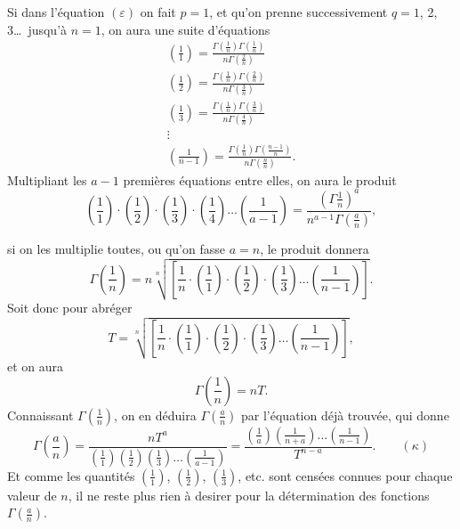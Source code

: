 \documentclass{article}
\begin{document}
Si dans l'équation $(\varepsilon)$ on fait $p=1$, et qu'on prenne successivement $q=1$, 2, 3\ldots\ jusqu'à $n=1$, on aura une suite d'équations
\[ \begin{gathered} \left(\frac{1}{1}\right)=\frac{\Gamma\left(\frac{1}{n}\right)\Gamma\left(\frac{1}{n}\right)}{n\Gamma\left(\frac{2}{n}\right)}\\ \left(\frac{1}{2}\right)=\frac{\Gamma\left(\frac{1}{n}\right)\Gamma\left(\frac{2}{n}\right)}{n\Gamma\left(\frac{3}{n}\right)}\\ \left(\frac{1}{3}\right)=\frac{\Gamma\left(\frac{1}{n}\right)\Gamma\left(\frac{3}{n}\right)}{n\Gamma\left(\frac{4}{n}\right)}\\ \vdots\\ \left(\frac{1}{n-1}\right)=\frac{\Gamma\left(\frac{1}{n}\right)\Gamma\left(\frac{n-1}{n}\right)}{n\Gamma\left(\frac{n}{n}\right)}. \end{gathered} \]
Multipliant les $a-1$ premières équations entre elles, on aura le produit
\[ \left(\frac{1}{1}\right)\cdot\left(\frac{1}{2}\right)\cdot\left(\frac{1}{3}\right)\cdot\left(\frac{1}{4}\right)\ldots\left(\frac{1}{a-1}\right)=\frac{\left(\Gamma\frac{1}{n}\right)^{a}}{n^{a-1}\Gamma\left(\frac{a}{n}\right)}, \]

si on les multiplie toutes, ou qu'on fasse $a=n$, le produit donnera
\[ \Gamma\left(\frac{1}{n}\right)=n\sqrt[n]{\left[\frac{1}{n}\cdot\left(\frac{1}{1}\right)\cdot\left(\frac{1}{2}\right)\cdot\left(\frac{1}{3}\right)\ldots\left(\frac{1}{n-1}\right)\right]}. \]
Soit donc pour abréger
\[ T=\sqrt[n]{\left[\frac{1}{n}\cdot\left(\frac{1}{1}\right)\cdot\left(\frac{1}{2}\right)\cdot\left(\frac{1}{3}\right)\ldots\left(\frac{1}{n-1}\right)\right]}, \]
et on aura
\[ \Gamma\left(\frac{1}{n}\right)=nT. \]
Connaissant $\Gamma\left(\frac{1}{n}\right)$, on en déduira $\Gamma\left(\frac{a}{n}\right)$ par l'équation déjà trouvée, qui donne
\[ \Gamma\left(\frac{a}{n}\right)=\frac{nT^{a}}{\left(\frac{1}{1}\right)\left(\frac{1}{2}\right)\left(\frac{1}{3}\right)\ldots\left(\frac{1}{a-1}\right)}=\frac{\left(\frac{1}{a}\right)\left(\frac{1}{n+a}\right)\ldots\left(\frac{1}{n-1}\right)}{T^{n-a}}.\qquad(\kappa) \]
Et comme les quantités $\left(\frac{1}{1}\right)$, $\left(\frac{1}{2}\right)$, $\left(\frac{1}{3}\right)$, etc. sont censées connues pour chaque valeur de $n$, il ne reste plus rien à desirer pour la détermination des fonctions $\Gamma\left(\frac{a}{n}\right)$.
\end{document}
